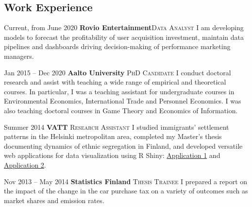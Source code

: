 \documentclass[10pt]{article} %
\begin{document}
\begin{paracol}{2}
\section{Work Experience}




\workposition{} %
{Current, from June 2020}
{\textbf{Rovio Entertainment}\hfill \textsc{Data Analyst}} %
 {}%
{I am developing models to forecast the profitability of user acquisition investment, maintain data pipelines and dashboards driving decision-making of performance marketing managers.}

\workposition{} %
{Jan 2015 -- Dec 2020}
{\textbf{Aalto University} \hfill \textsc{PhD Candidate}} %
{} %
{I conduct doctoral research and assist with teaching a wide range of empirical and theoretical courses. In particular, I was a teaching assistant for undergraduate courses in Environmental Economics, International Trade and Personnel Economics. I was also teaching doctoral courses in Game Theory and Economics of Information.} %


\workposition{} %
{Summer 2014} %
{\textbf{VATT} \hfill \textsc{Research Assistant}} %
{} %
{I studied immigrants' settlement patterns in the Helsinki metropolitan area, completed my Master's thesis documenting dynamics of ethnic segregation in Finland, and developed versatile web applications  for data visualization using R Shiny: \href{https://anzhukov.shinyapps.io/Maps/}{{\color[rgb]{0,0,1} Application 1}} and \href{https://anzhukov.shinyapps.io/Diss/}{{\color[rgb]{0,0,1} Application 2}}.}  %


\workposition{} %
{Nov 2013 -- May 2014} %
{\textbf{Statistics Finland} \hfill \textsc{Thesis Trainee}} %
{} %
{I prepared a report  on the impact of the change in the car purchase tax on a variety of outcomes such as market shares and emission rates.} %



\end{paracol}
\end{document}
